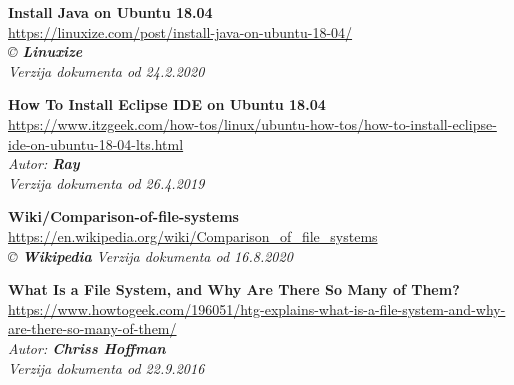 \documentclass[12pt,vi]{mitthesis}
\begin{document}
\begin{thebibliography}{38}
\textbf{Install Java on Ubuntu 18.04}\\
\url{https://linuxize.com/post/install-java-on-ubuntu-18-04/}\\
\textit{© \textbf{Linuxize}}\\
\textit{Verzija dokumenta od  24.2.2020}

\textbf{How To Install Eclipse IDE on Ubuntu 18.04}\\
\url{https://www.itzgeek.com/how-tos/linux/ubuntu-how-tos/how-to-install-eclipse-ide-on-ubuntu-18-04-lts.html}\\
\textit{Autor: \textbf{Ray}}\\
\textit{Verzija dokumenta od 26.4.2019}

\textbf{Wiki/Comparison-of-file-systems}\\
\url{https://en.wikipedia.org/wiki/Comparison_of_file_systems}\\
\textit{© \textbf{Wikipedia}}
\textit{Verzija dokumenta od 16.8.2020}

\textbf{What Is a File System, and Why Are There So Many of Them?}\\
\url{https://www.howtogeek.com/196051/htg-explains-what-is-a-file-system-and-why-are-there-so-many-of-them/}\\
\textit{Autor: \textbf{Chriss Hoffman}}\\
\textit{Verzija dokumenta od 22.9.2016}

\end{thebibliography}
\end{document}

